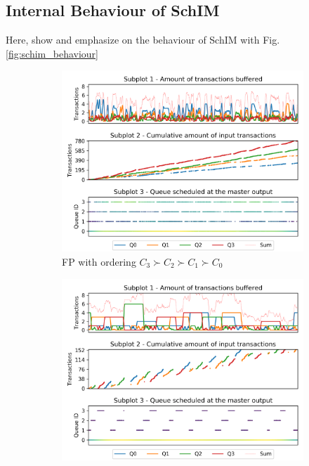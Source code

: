   \subsection{Internal Behaviour of SchIM}
    Here, show and emphasize on the behaviour of SchIM with Fig.\ref{fig:schim_behaviour}
    \begin{figure}
      \centering
      \begin{subfigure}{0.5\textwidth}
        \centering
        \includegraphics[scale=0.55]{images/iladata_fp_3_0f0e0d0c_20_3.png}
        \caption{FP with ordering $C_{3} \succ C_{2} \succ C_{1} \succ C_{0}$}
        \label{fig:schim_behaviour_fp}
      \end{subfigure}
      \begin{subfigure}{0.5\textwidth}
        \centering
        \includegraphics[scale=0.55]{images/iladata_tdma_3_3_512_512_1.png}

\end{subfigure}
\end{figure}

